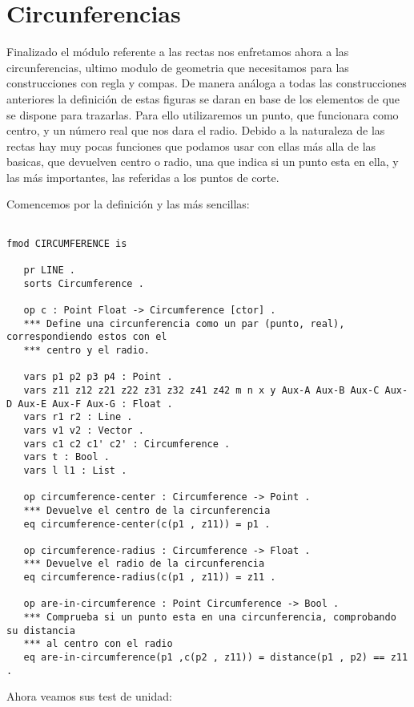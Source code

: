 \chapter{Circunferencias}\label{cap.3}

Finalizado el m\'odulo referente a las rectas nos enfretamos ahora a las circunferencias, ultimo modulo de geometria que necesitamos para las construcciones con regla y compas. De manera an\'aloga a todas las construcciones anteriores la definici\'on de estas figuras se daran en base de los elementos de que se dispone para trazarlas. Para ello utilizaremos un punto, que funcionara como centro, y un n\'umero real que nos dara el radio. Debido a la naturaleza de las rectas hay muy pocas funciones que podamos usar con ellas m\'as alla de las basicas, que devuelven centro o radio, una que indica si un punto esta en ella, y las más importantes, las referidas a los puntos de corte. 

Comencemos por la definici\'on y las m\'as sencillas:

\begin{verbatim}

fmod CIRCUMFERENCE is

   pr LINE .
   sorts Circumference .

   op c : Point Float -> Circumference [ctor] .
   *** Define una circunferencia como un par (punto, real), correspondiendo estos con el 
   *** centro y el radio.
	
   vars p1 p2 p3 p4 : Point .
   vars z11 z12 z21 z22 z31 z32 z41 z42 m n x y Aux-A Aux-B Aux-C Aux-D Aux-E Aux-F Aux-G : Float .
   vars r1 r2 : Line .
   vars v1 v2 : Vector .
   vars c1 c2 c1' c2' : Circumference .
   vars t : Bool .
   vars l l1 : List .
		
   op circumference-center : Circumference -> Point .
   *** Devuelve el centro de la circunferencia
   eq circumference-center(c(p1 , z11)) = p1 .

   op circumference-radius : Circumference -> Float .
   *** Devuelve el radio de la circunferencia
   eq circumference-radius(c(p1 , z11)) = z11 .

   op are-in-circumference : Point Circumference -> Bool .
   *** Comprueba si un punto esta en una circunferencia, comprobando su distancia 
   *** al centro con el radio
   eq are-in-circumference(p1 ,c(p2 , z11)) = distance(p1 , p2) == z11 .

\end{verbatim}  

Ahora veamos sus test de unidad:

